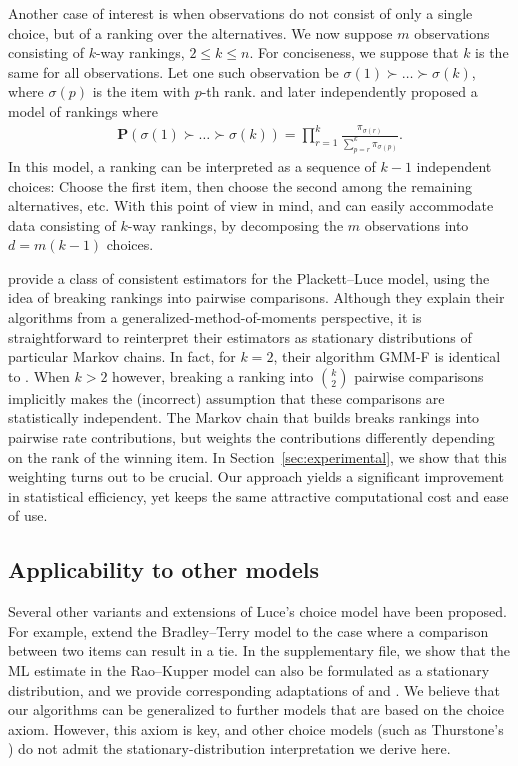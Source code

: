 Another case of interest is when observations do not consist of only a single choice, but of a ranking over the alternatives.
We now suppose $m$ observations consisting of $k$-way rankings, $2 \le k \le n$.
For conciseness, we suppose that $k$ is the same for all observations.
Let one such observation be $\sigma(1) \succ \ldots \succ \sigma(k)$, where $\sigma(p)$ is the item with $p$-th rank.
\citet{luce1959individual} and later \citet{plackett1975analysis} independently proposed a model of rankings where
\begin{align*}
\mathbf{P}\left( \sigma(1) \succ \ldots \succ \sigma(k) \right)
  = \prod_{r = 1}^{k} \frac{\pi_{\sigma(r)}}{\sum_{p = r}^{k} \pi_{\sigma(p)}}.
\end{align*}
In this model, a ranking can be interpreted as a sequence of $k-1$ independent choices:
Choose the first item, then choose the second among the remaining alternatives, etc.
With this point of view in mind, \LSR{} and \ILSR{} can easily accommodate data consisting of $k$-way rankings, by decomposing the $m$ observations into $d = m (k - 1)$ choices.

\citet{azari2013generalized} provide a class of consistent estimators for the Plackett--Luce model, using the idea of breaking rankings into pairwise comparisons.
Although they explain their algorithms from a generalized-method-of-moments perspective, it is straightforward to reinterpret their estimators as stationary distributions of particular Markov chains.
In fact, for $k = 2$, their algorithm GMM-F is identical to \LSR{}.
When $k > 2$ however, breaking a ranking into $\binom{k}{2}$ pairwise comparisons implicitly makes the (incorrect) assumption that these comparisons are statistically independent.
The Markov chain that \LSR{} builds breaks rankings into pairwise rate contributions, but weights the contributions differently depending on the rank of the winning item.
In Section~\ref{sec:experimental}, we show that this weighting turns out to be crucial.
Our approach yields a significant improvement in statistical efficiency, yet keeps the same attractive computational cost and ease of use.


\subsection{Applicability to other models}

Several other variants and extensions of Luce's choice model have been proposed.
For example, \citet{rao1967ties} extend the Bradley--Terry model to the case where a comparison between two items can result in a tie.
In the supplementary file, we show that the ML estimate in the Rao--Kupper model can also be formulated as a stationary distribution, and we provide corresponding adaptations of \LSR{} and \ILSR{}.
We believe that our algorithms can be generalized to further models that are based on the choice axiom.
However, this axiom is key, and other choice models (such as Thurstone's \citep{thurstone1927method}) do not admit the stationary-distribution interpretation we derive here.
